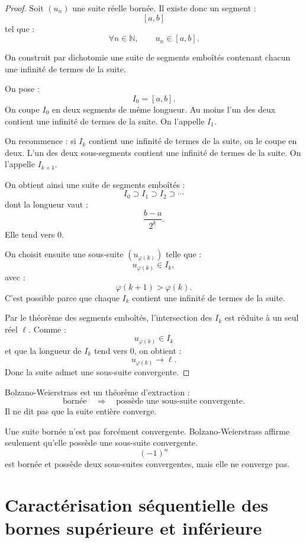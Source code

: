 \documentclass[11pt,a4paper]{article}
\newcommand{\N}{\mathbb N}
\begin{document}
\begin{proof}
Soit \((u_n)\) une suite réelle bornée.  
Il existe donc un segment :
\[
[a,b]
\]
tel que :
\[
\forall n\in\N,\qquad u_n\in[a,b].
\]

On construit par dichotomie une suite de segments emboîtés contenant chacun une infinité de termes de la suite.

On pose :
\[
I_0=[a,b].
\]
On coupe \(I_0\) en deux segments de même longueur.  
Au moins l'un des deux contient une infinité de termes de la suite.  
On l'appelle \(I_1\).

On recommence : si \(I_k\) contient une infinité de termes de la suite, on le coupe en deux.  
L'un des deux sous-segments contient une infinité de termes de la suite.  
On l'appelle \(I_{k+1}\).

On obtient ainsi une suite de segments emboîtés :
\[
I_0\supset I_1\supset I_2\supset \cdots
\]
dont la longueur vaut :
\[
\frac{b-a}{2^k}.
\]
Elle tend vers \(0\).

On choisit ensuite une sous-suite \((u_{\varphi(k)})\) telle que :
\[
u_{\varphi(k)}\in I_k,
\]
avec :
\[
\varphi(k+1)>\varphi(k).
\]
C'est possible parce que chaque \(I_k\) contient une infinité de termes de la suite.

Par le théorème des segments emboîtés, l'intersection des \(I_k\) est réduite à un seul réel \(\ell\).  
Comme :
\[
u_{\varphi(k)}\in I_k
\]
et que la longueur de \(I_k\) tend vers \(0\), on obtient :
\[
u_{\varphi(k)}\to\ell.
\]
Donc la suite admet une sous-suite convergente.
\end{proof}

\begin{retenirbox}
Bolzano-Weierstrass est un théorème d'extraction :  
\[
\text{bornée}
\quad\Longrightarrow\quad
\text{possède une sous-suite convergente}.
\]
Il ne dit pas que la suite entière converge.
\end{retenirbox}

\begin{erreurbox}
Une suite bornée n'est pas forcément convergente.  
Bolzano-Weierstrass affirme seulement qu'elle possède une sous-suite convergente.
\[
(-1)^n
\]
est bornée et possède deux sous-suites convergentes, mais elle ne converge pas.
\end{erreurbox}
\section{Caractérisation séquentielle des bornes supérieure et inférieure}
\end{document}
